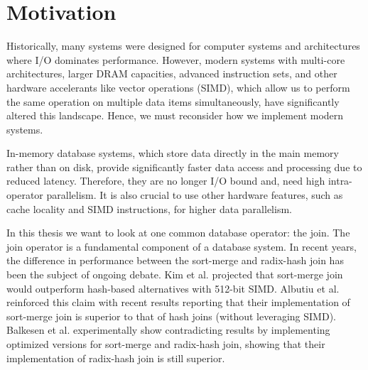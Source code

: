 \section{Motivation}
\label{sec:motivation}

Historically, many systems were designed for computer systems and architectures where I/O dominates
performance. However, modern systems with multi-core architectures, larger DRAM capacities,
advanced instruction sets, and other hardware accelerants like vector operations (SIMD), which allow us to
perform the same operation on multiple data items simultaneously, have significantly altered this
landscape. Hence, we must reconsider how we implement modern systems.

In-memory database systems, which store data directly in the main memory rather than on disk,
provide significantly faster data access and processing due to reduced latency.
Therefore, they are no longer I/O bound and, need high intra-operator
parallelism. It is also crucial to use other hardware features, such as cache locality and SIMD 
instructions, for higher data parallelism.

In this thesis we want to look at one common database operator: the join.
The join operator is a fundamental component of a database system.
In recent years, the difference in performance between the sort-merge and radix-hash join has been
the subject of ongoing debate. Kim et al. \cite{10.14778/1687553.1687564} projected that sort-merge 
join would outperform hash-based
alternatives with 512-bit SIMD. Albutiu et al. \cite{MPSM} reinforced this claim with recent results reporting that
their implementation of sort-merge join is superior to that of hash joins (without
leveraging SIMD). Balkesen et al. \cite{Balkesen} experimentally show contradicting results by implementing 
optimized versions for sort-merge and radix-hash join, showing that their implementation of
radix-hash join is still superior.


